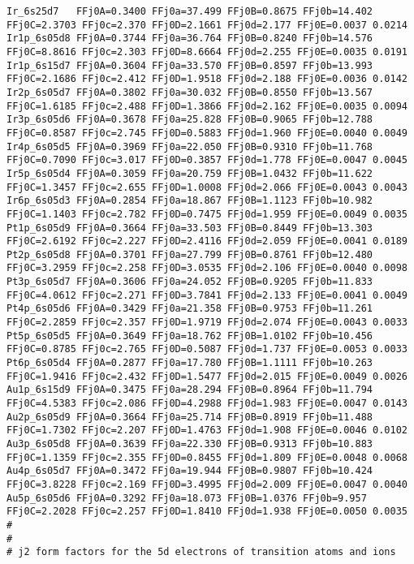 {\begin{verbatim}
Ir_6s25d7   FFj0A=0.3400 FFj0a=37.499 FFj0B=0.8675 FFj0b=14.402 FFj0C=2.3703 FFj0c=2.370 FFj0D=2.1661 FFj0d=2.177 FFj0E=0.0037 0.0214
Ir1p_6s05d8 FFj0A=0.3744 FFj0a=36.764 FFj0B=0.8240 FFj0b=14.576 FFj0C=8.8616 FFj0c=2.303 FFj0D=8.6664 FFj0d=2.255 FFj0E=0.0035 0.0191
Ir1p_6s15d7 FFj0A=0.3604 FFj0a=33.570 FFj0B=0.8597 FFj0b=13.993 FFj0C=2.1686 FFj0c=2.412 FFj0D=1.9518 FFj0d=2.188 FFj0E=0.0036 0.0142
Ir2p_6s05d7 FFj0A=0.3802 FFj0a=30.032 FFj0B=0.8550 FFj0b=13.567 FFj0C=1.6185 FFj0c=2.488 FFj0D=1.3866 FFj0d=2.162 FFj0E=0.0035 0.0094
Ir3p_6s05d6 FFj0A=0.3678 FFj0a=25.828 FFj0B=0.9065 FFj0b=12.788 FFj0C=0.8587 FFj0c=2.745 FFj0D=0.5883 FFj0d=1.960 FFj0E=0.0040 0.0049
Ir4p_6s05d5 FFj0A=0.3969 FFj0a=22.050 FFj0B=0.9310 FFj0b=11.768 FFj0C=0.7090 FFj0c=3.017 FFj0D=0.3857 FFj0d=1.778 FFj0E=0.0047 0.0045
Ir5p_6s05d4 FFj0A=0.3059 FFj0a=20.759 FFj0B=1.0432 FFj0b=11.622 FFj0C=1.3457 FFj0c=2.655 FFj0D=1.0008 FFj0d=2.066 FFj0E=0.0043 0.0043
Ir6p_6s05d3 FFj0A=0.2854 FFj0a=18.867 FFj0B=1.1123 FFj0b=10.982 FFj0C=1.1403 FFj0c=2.782 FFj0D=0.7475 FFj0d=1.959 FFj0E=0.0049 0.0035
Pt1p_6s05d9 FFj0A=0.3664 FFj0a=33.503 FFj0B=0.8449 FFj0b=13.303 FFj0C=2.6192 FFj0c=2.227 FFj0D=2.4116 FFj0d=2.059 FFj0E=0.0041 0.0189
Pt2p_6s05d8 FFj0A=0.3701 FFj0a=27.799 FFj0B=0.8761 FFj0b=12.480 FFj0C=3.2959 FFj0c=2.258 FFj0D=3.0535 FFj0d=2.106 FFj0E=0.0040 0.0098
Pt3p_6s05d7 FFj0A=0.3606 FFj0a=24.052 FFj0B=0.9205 FFj0b=11.833 FFj0C=4.0612 FFj0c=2.271 FFj0D=3.7841 FFj0d=2.133 FFj0E=0.0041 0.0049
Pt4p_6s05d6 FFj0A=0.3429 FFj0a=21.358 FFj0B=0.9753 FFj0b=11.261 FFj0C=2.2859 FFj0c=2.357 FFj0D=1.9719 FFj0d=2.074 FFj0E=0.0043 0.0033
Pt5p_6s05d5 FFj0A=0.3649 FFj0a=18.762 FFj0B=1.0102 FFj0b=10.456 FFj0C=0.8785 FFj0c=2.765 FFj0D=0.5087 FFj0d=1.737 FFj0E=0.0053 0.0033
Pt6p_6s05d4 FFj0A=0.2877 FFj0a=17.780 FFj0B=1.1111 FFj0b=10.263 FFj0C=1.9416 FFj0c=2.432 FFj0D=1.5477 FFj0d=2.015 FFj0E=0.0049 0.0026
Au1p_6s15d9 FFj0A=0.3475 FFj0a=28.294 FFj0B=0.8964 FFj0b=11.794 FFj0C=4.5383 FFj0c=2.086 FFj0D=4.2988 FFj0d=1.983 FFj0E=0.0047 0.0143
Au2p_6s05d9 FFj0A=0.3664 FFj0a=25.714 FFj0B=0.8919 FFj0b=11.488 FFj0C=1.7302 FFj0c=2.207 FFj0D=1.4763 FFj0d=1.908 FFj0E=0.0046 0.0102
Au3p_6s05d8 FFj0A=0.3639 FFj0a=22.330 FFj0B=0.9313 FFj0b=10.883 FFj0C=1.1359 FFj0c=2.355 FFj0D=0.8455 FFj0d=1.809 FFj0E=0.0048 0.0068
Au4p_6s05d7 FFj0A=0.3472 FFj0a=19.944 FFj0B=0.9807 FFj0b=10.424 FFj0C=3.8228 FFj0c=2.169 FFj0D=3.4995 FFj0d=2.009 FFj0E=0.0047 0.0040
Au5p_6s05d6 FFj0A=0.3292 FFj0a=18.073 FFj0B=1.0376 FFj0b=9.957  FFj0C=2.2028 FFj0c=2.257 FFj0D=1.8410 FFj0d=1.938 FFj0E=0.0050 0.0035
#
#
# j2 form factors for the 5d electrons of transition atoms and ions 

\end{verbatim}}
